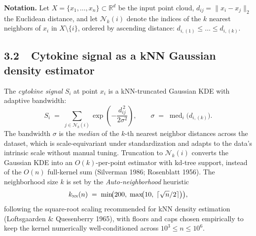 

\textbf{Notation.}\;
Let $X = \{x_1, \dots, x_n\} \subset \mathbb{R}^d$ be the input point cloud,
$d_{ij} = \lVert x_i - x_j \rVert_2$ the Euclidean distance, and let
$\mathcal{N}_k(i)$ denote the indices of the $k$ nearest neighbors of $x_i$
in $X \setminus \{i\}$, ordered by ascending distance:
$d_{i,(1)} \le \dots \le d_{i,(k)}$.


\subsection*{3.2~~Cytokine signal as a kNN Gaussian density estimator}

The \textit{cytokine signal} $S_i$ at point $x_i$ is a kNN-truncated
Gaussian KDE with adaptive bandwidth:
\begin{equation}
\label{eq:cytokine}
S_i \;=\; \sum_{j \in \mathcal{N}_k(i)} \exp\!\left(-\frac{d_{ij}^{\,2}}{2\sigma^2}\right),
\qquad
\sigma \;=\; \operatorname{med}_i\!\bigl(d_{i,(k)}\bigr).
\end{equation}
The bandwidth $\sigma$ is the \emph{median} of the $k$-th nearest neighbor
distances across the dataset, which is scale-equivariant under
standardization and adapts to the data's intrinsic scale without manual
tuning. Truncation to $\mathcal{N}_k(i)$ converts the Gaussian KDE into an
$O(k)$-per-point estimator with kd-tree support, instead of the $O(n)$
full-kernel sum (Silverman 1986; Rosenblatt 1956). The neighborhood size
$k$ is set by the \textit{Auto-neighborhood} heuristic
\begin{equation}
\label{eq:knn_auto}
k_{\textsc{nn}}(n) \;=\; \min\!\bigl(200,\; \max\!\bigl(10,\; \lceil \sqrt{n}/2 \rceil\bigr)\bigr),
\end{equation}
following the square-root scaling recommended for kNN density estimation
(Loftsgaarden \& Quesenberry 1965), with floors and caps chosen
empirically to keep the kernel numerically well-conditioned across
$10^3 \le n \le 10^6$.


